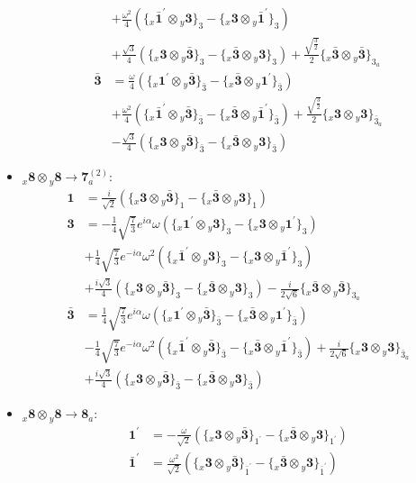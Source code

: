 \documentclass[english]{article}
\newcommand{\rep}[1]{\mathbf{#1}}
\newcommand{\repx}[2]{{}_{#2}\mathbf{#1}}
\newcommand{\subcg}[3]{\big\{ \repx{#1}{x}\otimes\repx{#2}{y}\big\}^{}_{#3}}
\begin{document}
\begin{itemize}
\begin{align*}
 & +\frac{\omega ^2}{4}\left(\subcg{\bar{1}^{\prime}}{3}{3}-\subcg{3}{\bar{1}^{\prime}}{3}\right) \\ 
 & +\frac{\sqrt{3}}{4}\left(\subcg{3}{\bar{3}}{3}-\subcg{\bar{3}}{3}{3}\right)+\frac{\sqrt{\frac{3}{2}}}{2}\subcg{\bar{3}}{\bar{3}}{3_{a}}
\\
\rep{\bar{3}} & = \frac{\omega }{4}\left(\subcg{1^{\prime}}{\bar{3}}{\bar{3}}-\subcg{\bar{3}}{1^{\prime}}{\bar{3}}\right) \\ 
 & +\frac{\omega ^2}{4}\left(\subcg{\bar{1}^{\prime}}{\bar{3}}{\bar{3}}-\subcg{\bar{3}}{\bar{1}^{\prime}}{\bar{3}}\right)+\frac{\sqrt{\frac{3}{2}}}{2}\subcg{3}{3}{\bar{3}_{a}} \\ 
 & -\frac{\sqrt{3}}{4}\left(\subcg{3}{\bar{3}}{\bar{3}}-\subcg{\bar{3}}{3}{\bar{3}}\right)
\end{align*}
\item $\repx{8}{x}\otimes\repx{8}{y}\to\rep{7}_{a}^{(2)}$:
\begin{align*}
\rep{1} & = \frac{i}{\sqrt{2}}\left(\subcg{3}{\bar{3}}{1}-\subcg{\bar{3}}{3}{1}\right)
\\
\rep{3} & = -\frac{1}{4} \sqrt{\frac{7}{3}} e^{i \alpha } \omega\left(\subcg{1^{\prime}}{3}{3}-\subcg{3}{1^{\prime}}{3}\right) \\ 
 & +\frac{1}{4} \sqrt{\frac{7}{3}} e^{-i \alpha } \omega ^2\left(\subcg{\bar{1}^{\prime}}{3}{3}-\subcg{3}{\bar{1}^{\prime}}{3}\right) \\ 
 & +\frac{i \sqrt{3}}{4}\left(\subcg{3}{\bar{3}}{3}-\subcg{\bar{3}}{3}{3}\right)-\frac{i}{2 \sqrt{6}}\subcg{\bar{3}}{\bar{3}}{3_{a}}
\\
\rep{\bar{3}} & = \frac{1}{4} \sqrt{\frac{7}{3}} e^{i \alpha } \omega\left(\subcg{1^{\prime}}{\bar{3}}{\bar{3}}-\subcg{\bar{3}}{1^{\prime}}{\bar{3}}\right) \\ 
 & -\frac{1}{4} \sqrt{\frac{7}{3}} e^{-i \alpha } \omega ^2\left(\subcg{\bar{1}^{\prime}}{\bar{3}}{\bar{3}}-\subcg{\bar{3}}{\bar{1}^{\prime}}{\bar{3}}\right)+\frac{i}{2 \sqrt{6}}\subcg{3}{3}{\bar{3}_{a}} \\ 
 & +\frac{i \sqrt{3}}{4}\left(\subcg{3}{\bar{3}}{\bar{3}}-\subcg{\bar{3}}{3}{\bar{3}}\right)
\end{align*}
\item $\repx{8}{x}\otimes\repx{8}{y}\to\rep{8}_{a}$:
\begin{align*}
\rep{1^{\prime}} & = -\frac{\omega }{\sqrt{2}}\left(\subcg{3}{\bar{3}}{1^{\prime}}-\subcg{\bar{3}}{3}{1^{\prime}}\right)
\\
\rep{\bar{1}^{\prime}} & = \frac{\omega ^2}{\sqrt{2}}\left(\subcg{3}{\bar{3}}{\bar{1}^{\prime}}-\subcg{\bar{3}}{3}{\bar{1}^{\prime}}\right)

\end{align*}
\end{itemize}
\end{document}
